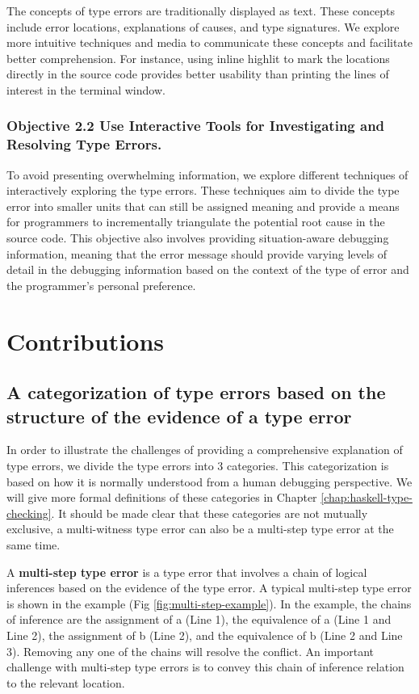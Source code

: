 The concepts of type errors are traditionally displayed as text. These concepts include error locations, explanations of causes, and type signatures. We explore more intuitive techniques and media to communicate these concepts and facilitate better comprehension. For instance, using inline highlit to mark the locations directly in the source code provides better usability than printing the lines of interest in the terminal window.

\subsubsection{Objective 2.2 Use Interactive Tools for Investigating and Resolving Type Errors.}

To avoid presenting overwhelming information, we explore different techniques of interactively exploring the type errors. These techniques aim to divide the type error into smaller units that can still be assigned meaning and provide a means for programmers to incrementally triangulate the potential root cause in the source code. This objective also involves providing situation-aware debugging information, meaning that the error message should provide varying levels of detail in the debugging information based on the context of the type of error and the programmer's personal preference.


\section{Contributions}

\subsection{A categorization of type errors based on the structure of the evidence of a type error}

In order to illustrate the challenges of providing a comprehensive explanation of type errors, we divide the type errors into 3 categories. This categorization is based on how it is normally understood from a human debugging perspective. We will give more formal definitions of these categories in Chapter \ref{chap:haskell-type-checking}. It should be made clear that these categories are not mutually exclusive, a multi-witness type error can also be a multi-step type error at the same time.  

A \textbf{multi-step type error} is a type error that involves a chain of logical inferences based on the evidence of the type error. A typical multi-step type error is shown in the example (Fig \ref{fig:multi-step-example}). In the example, the chains of inference are the assignment of a (Line 1), the equivalence of a (Line 1 and Line 2), the assignment of b (Line 2), and the equivalence of b (Line 2 and Line 3). Removing any one of the chains will resolve the conflict. An important challenge with multi-step type errors is to convey this chain of inference relation to the relevant location. 

